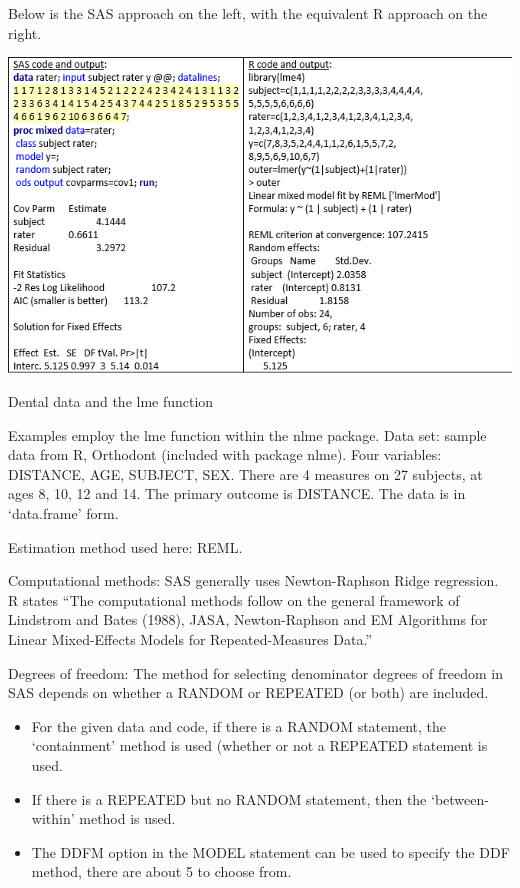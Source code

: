 \documentclass[
  9pt,
  ignorenonframetext,
]{beamer}
\begin{document}
\begin{frame}{}
\protect\hypertarget{section}{}
Below is the SAS approach on the left, with the equivalent R approach on
the right.

\begin{center}\includegraphics[width=0.7\linewidth]{figs_L9/f1} \end{center}
\end{frame}

\begin{frame}{Dental data and the lme function}
\protect\hypertarget{dental-data-and-the-lme-function}{}
\begin{block}{Examples employ the lme function within the nlme package.}
\protect\hypertarget{examples-employ-the-lme-function-within-the-nlme-package.}{}
Data set: sample data from R, Orthodont (included with package nlme).
Four variables: DISTANCE, AGE, SUBJECT, SEX. There are 4 measures on 27
subjects, at ages 8, 10, 12 and 14. The primary outcome is DISTANCE. The
data is in `data.frame' form.

Estimation method used here: REML.
\end{block}

\begin{block}{Computational methods:}
\protect\hypertarget{computational-methods}{}
SAS generally uses Newton-Raphson Ridge regression. R states ``The
computational methods follow on the general framework of Lindstrom and
Bates (1988), JASA, Newton-Raphson and EM Algorithms for Linear
Mixed-Effects Models for Repeated-Measures Data.''
\end{block}
\end{frame}

\begin{frame}{Degrees of freedom:}
\protect\hypertarget{degrees-of-freedom}{}
The method for selecting denominator degrees of freedom in SAS depends
on whether a RANDOM or REPEATED (or both) are included.

\begin{itemize}
\item
  For the given data and code, if there is a RANDOM statement, the
  `containment' method is used (whether or not a REPEATED statement is
  used.
\item
  If there is a REPEATED but no RANDOM statement, then the
  `between-within' method is used.
\item
  The DDFM option in the MODEL statement can be used to specify the DDF
  method, there are about 5 to choose from.
\end{itemize}
\end{frame}
\end{document}
